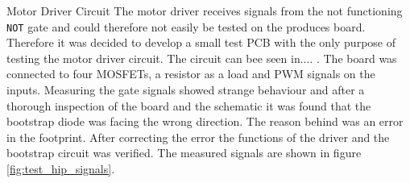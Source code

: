 \par{Motor Driver Circuit}
The motor driver receives signals from the not functioning \texttt{NOT} gate and could therefore not easily be tested on the produces board.
Therefore it was decided to develop a small test PCB with the only purpose of testing the motor driver circuit.
The circuit can bee seen in.... .
The board was connected to four MOSFETs, a resistor as a load and PWM signals on the inputs. 
Measuring the gate signals showed strange behaviour and after a thorough inspection of the board and the schematic it was found that the bootstrap diode was facing the wrong direction. 
The reason behind was an error in the footprint. 
After correcting the error the functions of the driver and the bootstrap circuit was verified. 
The measured signals are shown in figure \ref{fig:test_hip_signals}.
%    
